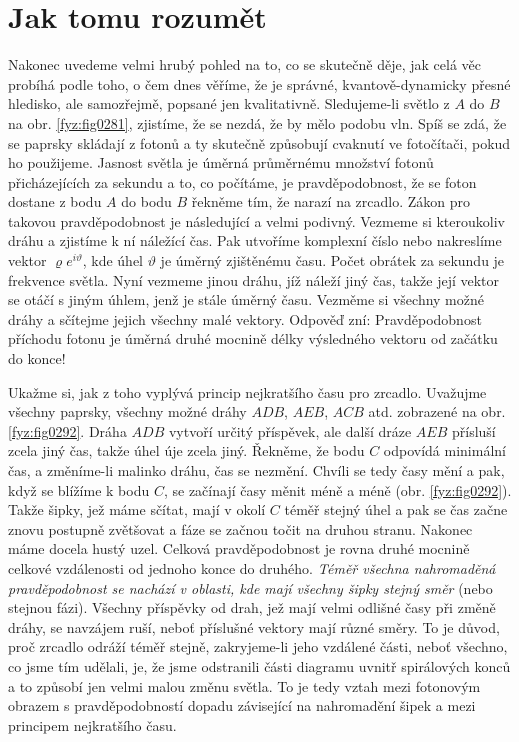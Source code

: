   \section{Jak tomu rozumět}\label{fyz:IchapXXVIsecVI}
    Nakonec uvedeme velmi hrubý pohled na to, co se skutečně děje, jak celá věc probíhá podle toho, 
    o čem dnes věříme, že je správné, kvantově-dynamicky přesné hledisko, ale samozřejmě, popsané 
    jen kvalitativně. Sledujeme-li světlo z \(A\) do \(B\) na obr. \ref{fyz:fig0281}, zjistíme, že 
    se nezdá, že by mělo podobu vln. Spíš se zdá, že se paprsky skládají z fotonů a ty skutečně 
    způsobují cvaknutí ve fotočítači, pokud ho použijeme. Jasnost světla je úměrná průměrnému 
    množství fotonů přicházejících za sekundu a to, co počítáme, je pravděpodobnost, že se foton 
    dostane z bodu \(A\) do bodu \(B\) řekněme tím, že narazí na zrcadlo. Zákon pro takovou 
    pravděpodobnost je následující a velmi podivný. Vezmeme si kteroukoliv dráhu a zjistíme k ní 
    náležící čas. Pak utvoříme komplexní číslo nebo nakreslíme vektor \(\varrho e^{i\vartheta}\), 
    kde úhel \(\vartheta\) je úměrný zjištěnému času. Počet obrátek za sekundu je frekvence 
    světla. Nyní vezmeme jinou dráhu, jíž náleží jiný čas, takže její vektor se otáčí s jiným 
    úhlem, jenž je stále úměrný času. Vezměme si všechny možné dráhy a sčítejme jejich všechny malé 
    vektory. Odpověď zní: Pravděpodobnost příchodu fotonu je úměrná druhé mocnině délky výsledného 
    vektoru od začátku do konce!
    
    Ukažme si, jak z toho vyplývá princip nejkratšího času pro zrcadlo. Uvažujme všechny paprsky, 
    všechny možné dráhy \(ADB\), \(AEB\), \(ACB\) atd. zobrazené na obr. \ref{fyz:fig0292}. Dráha 
    \(ADB\) vytvoří určitý příspěvek, ale další dráze \(AEB\) přísluší zcela jiný čas, takže úhel 
    úje zcela jiný. Řekněme, že bodu \(C\) odpovídá minimální čas, a změníme-li malinko dráhu, čas 
    se nezmění. Chvíli se tedy časy mění a pak, když se blížíme k bodu \(C\), se začínají časy 
    měnit méně a méně (obr. \ref{fyz:fig0292}). Takže šipky, jež máme sčítat, mají v okolí \(C\) 
    téměř stejný úhel a pak se čas začne znovu postupně zvětšovat a fáze se začnou točit na druhou 
    stranu. Nakonec máme docela hustý uzel. Celková pravděpodobnost je rovna druhé mocnině celkové 
    vzdálenosti od jednoho konce do druhého. \emph{Téměř všechna nahromaděná pravděpodobnost se 
    nachází v oblasti, kde mají všechny šipky stejný směr} (nebo stejnou fázi). Všechny příspěvky 
    od drah, jež mají velmi odlišné časy při změně dráhy, se navzájem ruší, neboť příslušné vektory 
    mají různé směry. To je důvod, proč zrcadlo odráží téměř stejně, zakryjeme-li jeho vzdálené 
    části, neboť všechno, co jsme tím udělali, je, že jsme odstranili části diagramu uvnitř 
    spirálových konců a to způsobí jen velmi malou změnu světla. To je tedy vztah mezi fotonovým 
    obrazem s pravděpodobností dopadu závisející na nahromadění šipek a mezi principem nejkratšího 
    času.
    
